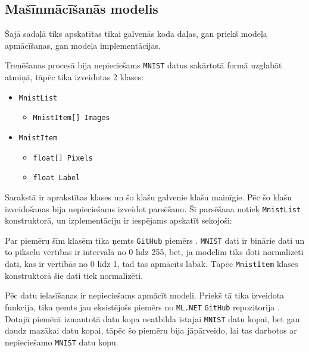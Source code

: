 \subsection{Mašīnmācīšanās modelis}

    Šajā sadaļā tiks apskatītas tikai galvenās koda daļas, gan priekš
    modeļa apmācīšanas, gan modeļa implementācijas.

    Trenēšanas procesā bija nepieciešams \texttt{MNIST} datus sakārtotā formā uzglabāt atmiņā, tāpēc
    tika izveidotas 2 klases:

    \begin{itemize}
        \item \texttt{MnistList}
        \begin{itemize}
            \item \texttt{MnistItem[] Images}
        \end{itemize}
        \item \texttt{MnistItem}
        \begin{itemize}
            \item \texttt{float[] Pixels}
            \item \texttt{float Label}
        \end{itemize}
    \end{itemize}

    Sarakstā ir aprakstītas klases un šo klašu galvenie klašu mainīgie. Pēc šo klašu izveidošanas
    bija nepieciešams izveidot parsēšanu. Šī parsēšana notiek \texttt{MnistList} konstruktorā,
    un izplementāciju ir iespējams apskatīt sekojoši:

    

    Par piemēru šīm klasēm tika ņemts \texttt{GitHub} piemērs \cite{paxbunPaxbunCntkMnistPractice2019}.
    \texttt{MNIST} dati ir binārie dati un to pikseļu vērtības ir intervālā no 0 līdz 255,
    bet, ja modelim tiks doti normalizēti dati, kas ir vērtībās no 0 līdz 1, tad tas
    apmācīts labāk. Tāpēc \texttt{MnistItem} klases konstruktorā šie dati tiek
    normalizēti.

    

    Pēc datu ielasīšanas ir nepieciešams apmācīt modeli. Priekš tā tika izveidota funkcija, tika ņemts jau eksistējošs piemērs no \texttt{ML.NET} \texttt{GitHub}
    repozitorija \cite{DotnetMachinelearningsamples2021}. Dotajā piemērā izmantotā datu kopa
    neatbilda īstajai \texttt{MNIST} datu kopai, bet gan daudz mazākai datu kopai, tāpēc šo piemēru bija
    jāpārveido, lai tas darbotos ar nepieciešamo \texttt{MNIST} datu kopu. \cite{MNISTHandwrittenDigit}

